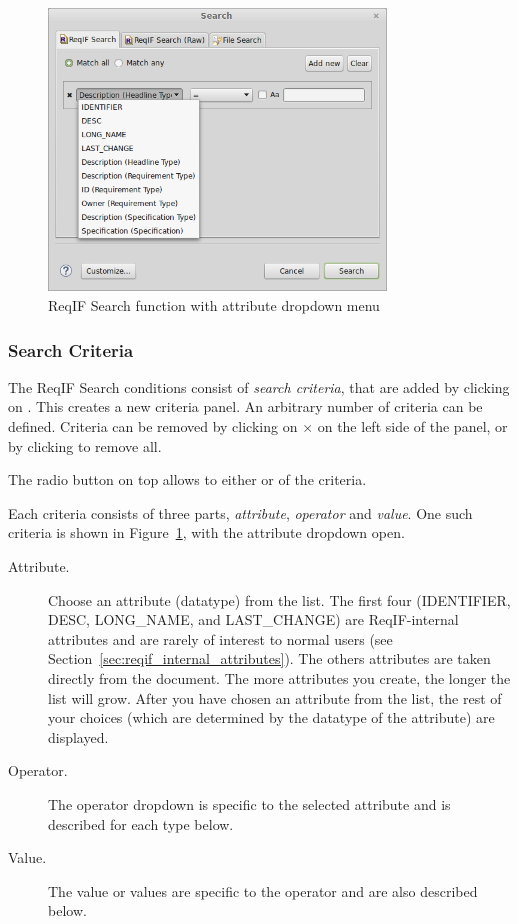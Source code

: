 \begin{figure}
  \centering
  \includegraphics[width=0.8\textwidth]{../rmf-images/reqIF_search_1.png}
  \caption{ReqIF Search function with attribute dropdown menu}
  \label{fig:reqif_search}
\end{figure}
\label{sec:reqif_search}

\subsubsection{Search Criteria}

The ReqIF Search conditions consist of \textit{search criteria}, that are added by clicking on .  This creates a new criteria panel.  An arbitrary number of criteria can be defined.  Criteria can be removed by clicking on $\times$  on the left side of the panel, or by clicking  to remove all.

The radio button on top allows to either  or  of the criteria.

Each criteria consists of three parts, \textit{attribute}, \textit{operator} and \textit{value}.  One such criteria is shown in Figure~\ref{fig:reqif_search}, with the attribute dropdown open.

\begin{description}
\item[Attribute.]  Choose an attribute (datatype) from the list.  The first four (IDENTIFIER, DESC, LONG\_NAME, and LA\-ST\-\_CHANGE) are ReqIF-internal attributes and are rarely of interest to normal users (see Section~\ref{sec:reqif_internal_attributes}).  The others attributes are taken directly from the document.  The more attributes you create, the longer the list will grow.  After you have chosen an attribute from the list, the rest of your choices (which are determined by the datatype of the attribute) are displayed.
\item[Operator.] The operator dropdown is specific to the selected attribute and is described for each type below.
\item[Value.] The value or values are specific to the operator and are also described below.
\end{description}

